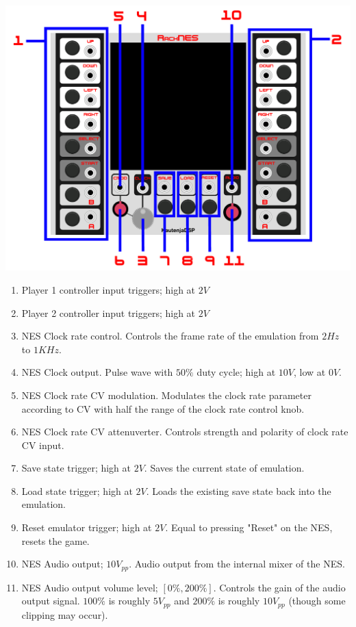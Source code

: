 \documentclass[12pt,a4paper]{article}
\begin{document}

\includegraphics[width=\textwidth]{RackNES-Manual}
\clearpage

\begin{enumerate}
  \item Player 1 controller input triggers; high at $2V$
  \item Player 2 controller input triggers; high at $2V$
  \item NES Clock rate control. Controls the frame rate of the emulation from
    $2Hz$ to $1KHz$.
  \item NES Clock output. Pulse wave with $50\%$ duty cycle; high at $10V$,
    low at $0V$.
  \item NES Clock rate CV modulation. Modulates the clock rate parameter according
    to CV with half the range of the clock rate control knob.
  \item NES Clock rate CV attenuverter. Controls strength and polarity of
    clock rate CV input.
  \item Save state trigger; high at $2V$. Saves the current state of emulation.
  \item Load state trigger; high at $2V$. Loads the existing save state back
    into the emulation.
  \item Reset emulator trigger; high at $2V$. Equal to pressing "Reset" on the
    NES, resets the game.
  \item NES Audio output; $10V_{pp}$. Audio output from the internal mixer of
    the NES.
  \item NES Audio output volume level; $[0\%,200\%]$. Controls the gain of the
    audio output signal. $100\%$ is roughly $5V_{pp}$ and $200\%$ is roughly
    $10V_{pp}$ (though some clipping may occur).
\end{enumerate}

\clearpage
\renewcommand\refname{References \& Acknowledgments}
\nocite{*}


\end{document}
